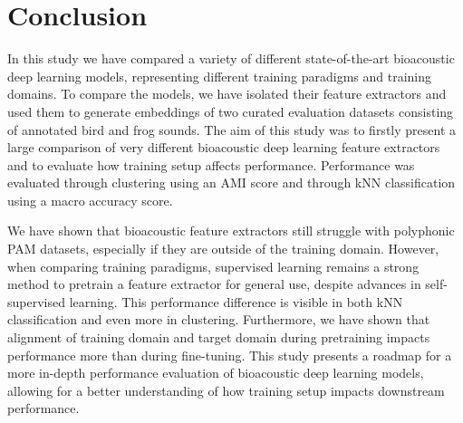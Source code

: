 \section{Conclusion}
\label{sec:conslusion}

In this study we have compared a variety of different state-of-the-art bioacoustic deep learning models, representing different training paradigms and training domains.
To compare the models, we have isolated their feature extractors and used them to generate embeddings of two curated evaluation datasets consisting of annotated bird and frog sounds.
The aim of this study was to firstly present a large comparison of very different bioacoustic deep learning feature extractors and to evaluate how training setup affects performance.
Performance was evaluated through clustering using an AMI score and through kNN classification using a macro accuracy score.

We have shown that bioacoustic feature extractors still struggle with polyphonic PAM datasets, especially if they are outside of the training domain.
However, when comparing training paradigms,  supervised learning remains a strong method to pretrain a feature extractor for general use, despite advances in self-supervised learning.
This performance difference is visible in both kNN classification and even more in clustering.
Furthermore, we have shown that alignment of training domain and target domain during pretraining impacts performance more than during fine-tuning.
This study presents a roadmap for a more in-depth performance evaluation of bioacoustic deep learning models, allowing for a better understanding of how training setup impacts downstream performance.
